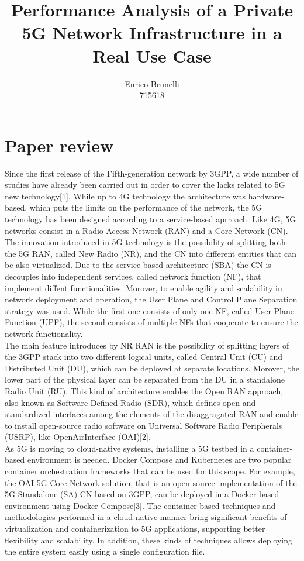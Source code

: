 \documentclass{report}
\author{Enrico Brunelli\\715618}
\title{Performance Analysis of a Private 5G Network Infrastructure in a Real Use Case
}
\date{}
\begin{document}
	\maketitle
	\tableofcontents
\chapter{Paper review}
Since the first release of the Fifth-generation network by 3GPP, a wide number of studies have already been carried out in order to cover the lacks related to 5G new technology[1]. While up to 4G technology the architecture was hardware-based, which puts the limits on the performance of the network, the 5G technology has been designed according to a service-based aprroach. Like 4G, 5G networks consist in a Radio Access Network (RAN) and a Core Network (CN). The innovation introduced in 5G technology is the possibility of splitting both the 5G RAN, called New Radio (NR), and the CN into different entities that can be also virtualized. Due to the service-based architecture (SBA) the CN is decouples into independent services, called network function (NF), that implement diffent functionalities. Morover, to enable agility and scalability in network deployment and operation, the User Plane and Control Plane Separation strategy was used. While the first one consists of only one NF, called User Plane Function (UPF), the second consists of multiple NFs that cooperate to ensure the network functionality. \\
The main feature introduces by NR RAN is the possibility of splitting layers of the 3GPP stack into two different logical units, called Central Unit (CU) and Distributed Unit (DU), which can be deployed at separate locations. Morover, the lower part of the physical layer can be separated from the DU in a standalone Radio Unit (RU). This kind of architecture enables the Open RAN approach, also known as Software Defined Radio (SDR), which defines open and standardized interfaces among the elements of the disaggragated RAN and enable to install open-source radio software on Universal Software Radio Peripherals (USRP), like OpenAirInterface (OAI)[2]. \\
As 5G is moving to cloud-native systems, installing a 5G testbed in a container-based environment is needed. Docker Compose and Kubernetes are two popular container orchestration frameworks that can be used for this scope. For example, the OAI 5G Core Network solution, that is an open-source implementation of the 5G Standalone (SA) CN based on 3GPP, can be deployed in a Docker-based environment using Docker Compose[3]. The container-based techniques and methodologies performed in a cloud-native manner bring significant benefits of virtualization and containerization to 5G applications, supporting better flexibility and scalability. In addition, these kinds of techniques allows deploying the entire system easily using a single configuration file.\\
\end{document}
